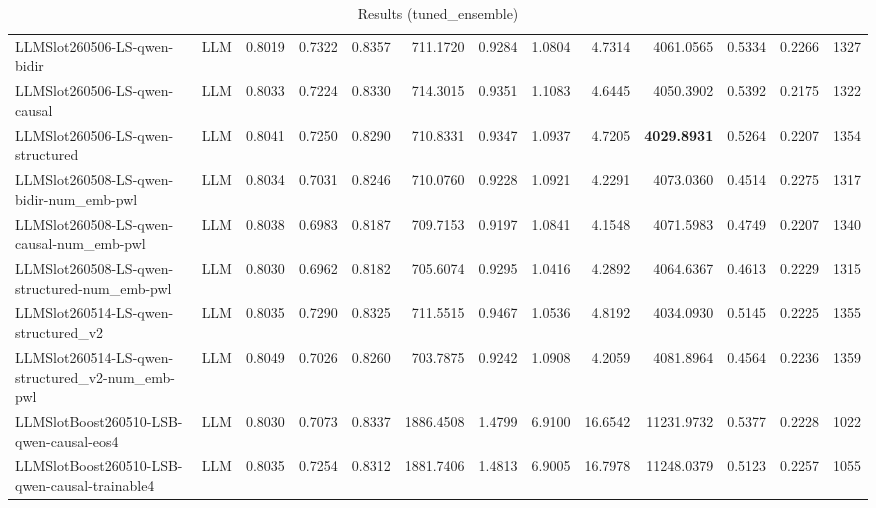 \begin{table}[htbp]
{\begin{tabular}{ll|rrrrrrrrrr|r}
LLMSlot260506-LS-qwen-bidir & LLM & 0.8019 & 0.7322 & 0.8357 & 711.1720 & 0.9284 & 1.0804 & 4.7314 & 4061.0565 & 0.5334 & 0.2266 & 1327 \\
LLMSlot260506-LS-qwen-causal & LLM & 0.8033 & 0.7224 & 0.8330 & 714.3015 & 0.9351 & 1.1083 & 4.6445 & 4050.3902 & 0.5392 & 0.2175 & 1322 \\
LLMSlot260506-LS-qwen-structured & LLM & 0.8041 & 0.7250 & 0.8290 & 710.8331 & 0.9347 & 1.0937 & 4.7205 & \textbf{4029.8931} & 0.5264 & 0.2207 & 1354 \\
LLMSlot260508-LS-qwen-bidir-num\_emb-pwl & LLM & 0.8034 & 0.7031 & 0.8246 & 710.0760 & 0.9228 & 1.0921 & 4.2291 & 4073.0360 & 0.4514 & 0.2275 & 1317 \\
LLMSlot260508-LS-qwen-causal-num\_emb-pwl & LLM & 0.8038 & 0.6983 & 0.8187 & 709.7153 & 0.9197 & 1.0841 & 4.1548 & 4071.5983 & 0.4749 & 0.2207 & 1340 \\
LLMSlot260508-LS-qwen-structured-num\_emb-pwl & LLM & 0.8030 & 0.6962 & 0.8182 & 705.6074 & 0.9295 & 1.0416 & 4.2892 & 4064.6367 & 0.4613 & 0.2229 & 1315 \\
LLMSlot260514-LS-qwen-structured\_v2 & LLM & 0.8035 & 0.7290 & 0.8325 & 711.5515 & 0.9467 & 1.0536 & 4.8192 & 4034.0930 & 0.5145 & 0.2225 & 1355 \\
LLMSlot260514-LS-qwen-structured\_v2-num\_emb-pwl & LLM & 0.8049 & 0.7026 & 0.8260 & 703.7875 & 0.9242 & 1.0908 & 4.2059 & 4081.8964 & 0.4564 & 0.2236 & 1359 \\
LLMSlotBoost260510-LSB-qwen-causal-eos4 & LLM & 0.8030 & 0.7073 & 0.8337 & 1886.4508 & 1.4799 & 6.9100 & 16.6542 & 11231.9732 & 0.5377 & 0.2228 & 1022 \\
LLMSlotBoost260510-LSB-qwen-causal-trainable4 & LLM & 0.8035 & 0.7254 & 0.8312 & 1881.7406 & 1.4813 & 6.9005 & 16.7978 & 11248.0379 & 0.5123 & 0.2257 & 1055 \\
\bottomrule
\end{tabular}
}
\caption{Results (tuned_ensemble)}
\label{tab:results_tuned_ensemble}
\end{table}